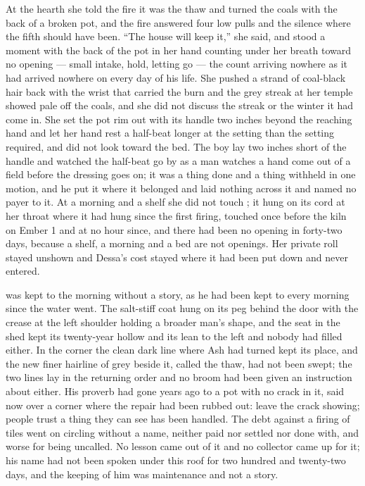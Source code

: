 At the hearth she told the fire it was the thaw and turned the coals with the back of a broken pot, and the fire answered four low pulls and the silence where the fifth should have been. “The house will keep it,” she said, and stood a moment with the back of the pot in her hand counting under her breath toward no opening --- small intake, hold, letting go --- the count arriving nowhere as it had arrived nowhere on every day of his life. She pushed a strand of coal-black hair back with the wrist that carried the burn and the grey streak at her temple showed pale off the coals, and she did not discuss the streak or the winter it had come in. She set the pot rim out with its handle two inches beyond the reaching hand and let her hand rest a half-beat longer at the setting than the setting required, and did not look toward the bed. The boy lay two inches short of the handle and watched the half-beat go by as a man watches a hand come out of a field before the dressing goes on; it was a thing done and a thing withheld in one motion, and he put it where it belonged and laid nothing across it and named no payer to it. At a morning and a shelf she did not touch ; it hung on its cord at her throat where it had hung since the first firing, touched once before the kiln on Ember 1 and at no hour since, and there had been no opening in forty-two days, because a shelf, a morning and a bed are not openings. Her private roll stayed unshown and Dessa's cost stayed where it had been put down and never entered.

 was kept to the morning without a story, as he had been kept to every morning since the water went. The salt-stiff coat hung on its peg behind the door with the crease at the left shoulder holding a broader man's shape, and the seat in the shed kept its twenty-year hollow and its lean to the left and nobody had filled either. In the corner the clean dark line where Ash had turned kept its place, and the new finer hairline of grey beside it, called the thaw, had not been swept; the two lines lay in the returning order and no broom had been given an instruction about either. His proverb had gone years ago to a pot with no crack in it, said now over a corner where the repair had been rubbed out: leave the crack showing; people trust a thing they can see has been handled. The debt against a firing of tiles went on circling without a name, neither paid nor settled nor done with, and worse for being uncalled. No lesson came out of it and no collector came up  for it; his name had not been spoken under this roof for two hundred and twenty-two days, and the keeping of him was maintenance and not a story.


